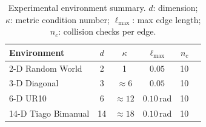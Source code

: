 \documentclass[journal]{IEEEtran}
\begin{document}
\begin{table}[t]
\centering
\footnotesize %
\caption{Experimental environment summary.
$d$: dimension; $\kappa$: metric condition number;
$\ell_{\max}$: max edge length;
$n_c$: collision checks per edge.}
\label{tab:environments}
\setlength{\tabcolsep}{3pt}

\begin{tabular}{@{}l c c c r r@{}}
\toprule
\textbf{Environment} & $d$ & $\kappa$ 
  & $\ell_{\max}$ & $n_c$ \\
\midrule
2-D Random World       & 2  & 1                 & $0.05$       & 10 \\
3-D Diagonal           & 3  & $\approx 6$       & $0.05$       & 10 \\
6-D UR10               & 6  & $\approx 12$      & $0.10$\,rad  & 10 \\
14-D Tiago Bimanual    & 14 & $\approx 18$      & $0.10$\,rad  & 10 \\
\bottomrule
\end{tabular}
\vspace{-5mm}
\end{table}
\end{document}
